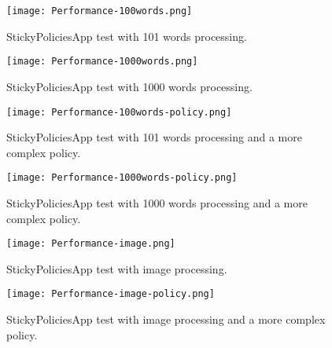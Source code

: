\begin{figure} [hb]
	\centering
	\texttt{[image: Performance-100words.png]}
	\caption{StickyPoliciesApp test with 101 words processing.}
	\label{fig:performance-100words}
\end{figure}
\begin{figure}
	\centering
	\texttt{[image: Performance-1000words.png]}
	\caption{StickyPoliciesApp test with 1000 words processing.}
	\label{fig:performance-1000words}
\end{figure}
\begin{figure}
	\centering
	\texttt{[image: Performance-100words-policy.png]}
	\caption{StickyPoliciesApp test with 101 words processing and a more complex policy.}
	\label{fig:performance-100words-policy}
\end{figure}
\begin{figure}
	\centering
	\texttt{[image: Performance-1000words-policy.png]}
	\caption{StickyPoliciesApp test with 1000 words processing and a more complex policy.}
	\label{fig:performance-1000words-policy}
\end{figure}
\begin{figure}
	\centering
	\texttt{[image: Performance-image.png]}
	\caption{StickyPoliciesApp test with image processing.}
	\label{fig:performance-image}
\end{figure}
\begin{figure}
	\centering
	\texttt{[image: Performance-image-policy.png]}
	\caption{StickyPoliciesApp test with image processing and a more complex policy.}
	\label{fig:performance-image-policy}
\end{figure}